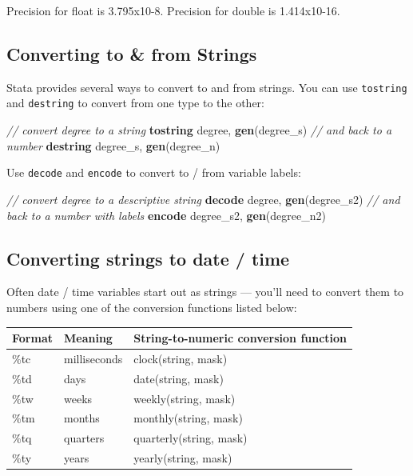 \documentclass[
]{book}
\newenvironment{Shaded}{\begin{snugshade}}{\end{snugshade}}
\newcommand{\CommentTok}[1]{\textcolor[rgb]{0.56,0.35,0.01}{\textit{#1}}}
\newcommand{\KeywordTok}[1]{\textcolor[rgb]{0.13,0.29,0.53}{\textbf{#1}}}
\newcommand{\NormalTok}[1]{#1}
\begin{document}
Precision for float is 3.795x10-8. Precision for double is 1.414x10-16.

\hypertarget{converting-to-from-strings}{%
\subsection{Converting to \& from Strings}\label{converting-to-from-strings}}

Stata provides several ways to convert to and from strings. You can use \texttt{tostring} and \texttt{destring} to convert from one type to the other:

\begin{Shaded}
\begin{Highlighting}[]
\CommentTok{// convert degree to a string}
\KeywordTok{tostring}\NormalTok{ degree, }\KeywordTok{gen}\NormalTok{(degree\_s)}
\CommentTok{// and back to a number}
\KeywordTok{destring}\NormalTok{ degree\_s, }\KeywordTok{gen}\NormalTok{(degree\_n)}
\end{Highlighting}
\end{Shaded}

Use \texttt{decode} and \texttt{encode} to convert to / from variable labels:

\begin{Shaded}
\begin{Highlighting}[]
\CommentTok{// convert degree to a descriptive string}
\KeywordTok{decode}\NormalTok{ degree, }\KeywordTok{gen}\NormalTok{(degree\_s2)}
\CommentTok{// and back to a number with labels}
\KeywordTok{encode}\NormalTok{ degree\_s2, }\KeywordTok{gen}\NormalTok{(degree\_n2)}
\end{Highlighting}
\end{Shaded}

\hypertarget{converting-strings-to-date-time}{%
\subsection{Converting strings to date / time}\label{converting-strings-to-date-time}}

Often date / time variables start out as strings --- you'll need to convert them to numbers using one of the conversion functions listed below:

\begin{longtable}[]{@{}lll@{}}
\toprule
Format & Meaning & String-to-numeric conversion function\tabularnewline
\midrule
\endhead
\%tc & milliseconds & clock(string, mask)\tabularnewline
\%td & days & date(string, mask)\tabularnewline
\%tw & weeks & weekly(string, mask)\tabularnewline
\%tm & months & monthly(string, mask)\tabularnewline
\%tq & quarters & quarterly(string, mask)\tabularnewline
\%ty & years & yearly(string, mask)\tabularnewline
\bottomrule
\end{longtable}
\end{document}
